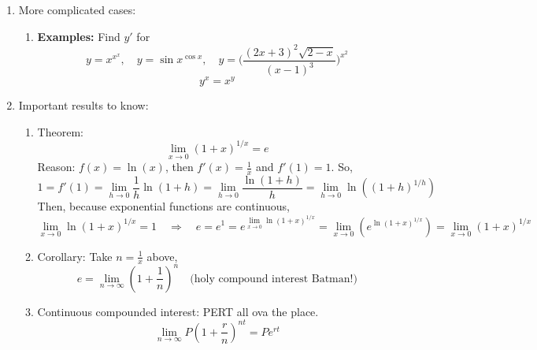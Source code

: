 \documentclass{article}
\begin{document}
\begin{enumerate}
\item More complicated cases:
\begin{enumerate}
\item {\bf Examples:} Find $y'$ for 
$$
y = x^{x^x}, \quad y = \sin x^{\cos x}, \quad y = \Big(\frac{(2x+3)^2\sqrt{2-x}}{(x-1)^3}\Big)^{x^2}
$$
$$
y^x = x^y
$$
\end{enumerate}

\item Important results to know:
\begin{enumerate}
\item Theorem:
$$
\lim_{x\rightarrow 0} (1+x)^{1/x} = e
$$
Reason: $f(x)=\ln(x)$, then $f'(x)=\frac{1}{x}$ and $f'(1)=1$. So,
$$
1=f'(1)=\lim_{h\rightarrow 0} \frac{1}{h}\ln(1+h)=\lim_{h\rightarrow 0} \frac{\ln(1+h)}{h}=\lim_{h\rightarrow 0} \ln((1+h)^{1/h})
$$
Then, because exponential functions are continuous,
$$
\lim_{x\rightarrow 0}\ln(1+x)^{1/x} = 1 \quad \Rightarrow \quad e=e^1=e^{\lim_{x\rightarrow 0}\ln(1+x)^{1/x}} = \lim_{x\rightarrow 0} (e^{\ln(1+x)^{1/x}})=\lim_{x\rightarrow 0} (1+x)^{1/x}
$$
\item Corollary: Take $n=\frac{1}{x}$ above,
$$
e=\lim_{n\rightarrow \infty}(1+\frac{1}{n})^n \quad \text{(holy compound interest Batman!)}
$$
\item Continuous compounded interest: PERT all ova the place.
$$
\lim_{n\rightarrow \infty}P(1+\frac{r}{n})^{nt}  = Pe^{rt}
$$
\end{enumerate}
\end{enumerate}


\end{document}
